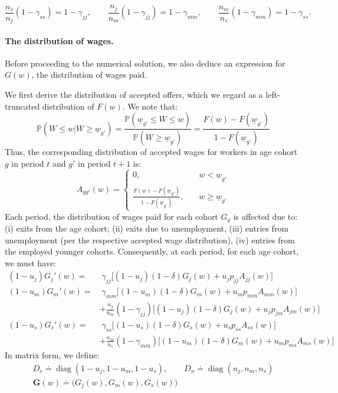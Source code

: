 \documentclass{article}
\newcommand{\lbar}[1]{\underline{#1}} %
\begin{document}
\[
\frac{n_s}{n_j}(1-\gamma_{ss})
=
1-\gamma_{jj},
\qquad
\frac{n_j}{n_m}(1-\gamma_{jj})
=
1-\gamma_{mm},
\qquad
\frac{n_m}{n_s}(1-\gamma_{mm})
=
1-\gamma_{ss}.
\]
\par\smallskip

\paragraph{The distribution of wages.} Before proceeding to the numerical solution, we also deduce an expression for $G(w)$, the distribution of wages paid. 

We first derive the distribution of accepted offers, which we regard as a left-truncated distribution of $F(w)$. We note that:
\[
\mathbb{P}(W\leq w| W \geq \lbar{w}_{g'})=\frac{\mathbb{P}(\lbar{w}_{g'}\leq W\leq w)}{\mathbb{P}(W\geq \lbar{w}_{g'})}=\frac{F(w)-F(\lbar{w}_{g'})}{1-F(\lbar{w}_{g'})}
\]
Thus, the corresponding distribution of accepted wages for workers in age cohort $g$ in period $t$ and $g'$ in period $t+1$ is:
\[
A_{gg'}(w)=
\begin{cases}
    0,\quad &w<\lbar{w}_{g'}\\
    \frac{F(w)-F(\lbar{w}_{g'})}{1-F(\lbar{w}_{g'})},
    \quad &w\geq\lbar{w}_{g'}
\end{cases}
\]
Each period, the distribution of wages paid for each cohort $G_g$ is affected due to: (i) exits from the age cohort; (ii) exits due to unemployment, (iii) entries from unemployment (per the respective accepted wage distribution), (iv) entries from the employed younger cohorts. Consequently, at each period, for each age cohort, we must have:
\begin{align*}
(1-u_j)G_j'(w)=&\;\gamma_{jj}\bigl[(1-u_j)(1-\delta)G_j(w)+u_jp_{jj}A_{jj}(w)\bigr]\\
(1-u_m)G_m'(w)=&\;\gamma_{mm}\bigl[(1-u_m)(1-\delta)G_m(w)+u_mp_{mm}A_{mm}(w)\bigr]\\
&+\frac{n_j}{n_m}(1-\gamma_{jj})\bigl[(1-u_j)(1-\delta)G_j(w)+u_jp_{jm}A_{jm}(w)\bigr]\\
(1-u_s)G_s'(w)=&\;\gamma_{ss}\bigl[(1-u_s)(1-\delta)G_s(w)+u_sp_{ss}A_{ss}(w)\bigr]\\
&+\frac{n_m}{n_s}(1-\gamma_{mm})\bigl[(1-u_m)(1-\delta)G_m(w)+u_mp_{ms}A_{ms}(w)\bigr]
\end{align*}
In matrix form, we define:
\begin{align*}
D_e
\doteq
\operatorname{diag}(1-u_j,1-u_m,1-u_s),
\qquad
D_n
\doteq
\operatorname{diag}(n_j,n_m,n_s)\\
\mathbf{G}(w)\doteq\bigl(G_j(w), G_m(w), G_s(w)\bigr)\qquad\qquad\qquad
\end{align*}
\end{document}
